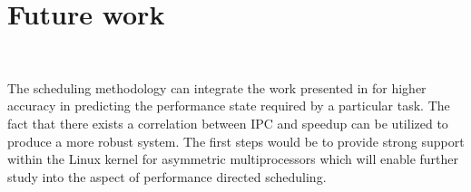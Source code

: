 \chapter{Future work}~\label{chap:future}

The scheduling methodology can integrate the work presented in \cite{PredictionModel}
for higher accuracy in predicting the performance state required by a particular task. 
The fact that there exists a correlation between
IPC and speedup can be utilized to produce a more robust system. The first
steps would be to provide strong support within the Linux kernel for asymmetric
multiprocessors which will enable further study into the aspect of performance
directed scheduling. 
